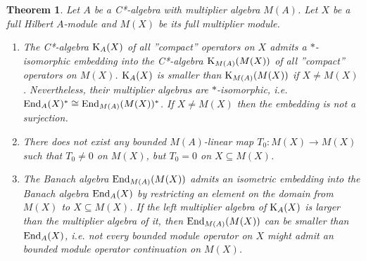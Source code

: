\documentclass{amsart}
\newtheorem{thm}{Theorem}[section]
\theoremstyle{definition}
\begin{document}
\begin{thm} 
Let $A$ be a C*-algebra with multiplier algebra $M(A)$. Let $X$ be a full Hilbert $A$-module and $M(X)$ be its full multiplier module.
\begin{enumerate}
  \item The C*-algebra ${\rm K}_A(X)$ of all ''compact'' operators on $X$ admits a $*$-isomor\-phic embedding into the C*-algebra ${\rm K}_{M(A)}(M(X))$ of all ''compact'' operators on $M(X)$. ${\rm K}_A(X)$ is smaller than ${\rm K}_{M(A)}(M(X))$ if $X \neq M(X)$. Nevertheless, their multiplier algebras are $*$-isomorphic, i.e. ${\rm End}_A(X)^* \cong {\rm End}_{M(A)}(M(X))^*$. If $X \neq M(X)$ then the embedding is not a surjection. 
  \item There does not exist any bounded $M(A)$-linear map $T_0: M(X) \to M(X)$ such that $T_0 \neq 0$ on $M(X)$, but $T_0 =0$ on $X \subseteq M(X)$.
  \item The Banach algebra ${\rm End}_{M(A)}(M(X))$ admits an isometric embedding into the Banach algebra ${\rm End}_A(X)$ by restricting an element on the domain from $M(X)$ to $X\subseteq M(X)$. If the left multiplier algebra of ${\rm K}_A(X)$ is larger than the multiplier algebra of it, then ${\rm End}_{M(A)}(M(X))$ can be smaller than ${\rm End}_A(X)$, i.e. not every bounded module operator on $X$ might admit an bounded module operator continuation on $M(X)$.  
\end{enumerate}
\end{thm}
\end{document}
